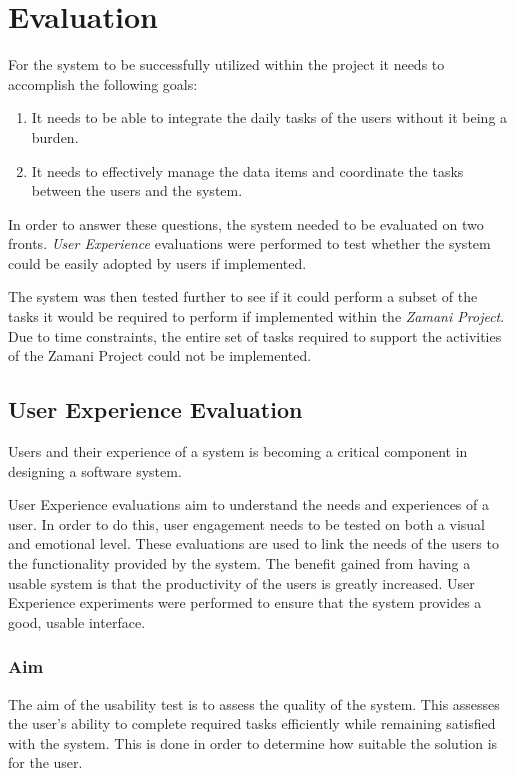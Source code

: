 \chapter{Evaluation\label{chap3}}

For the system to be successfully utilized within the project
it needs to accomplish the following goals:
\begin{enumerate}
\item It needs to be able to integrate the daily tasks of the users
      without it being a burden.
\item It needs to effectively  manage the data items and
      coordinate the tasks between the users and the system.
\end{enumerate}

In order to answer these questions, the system needed to be evaluated on two
fronts. \emph{User Experience} evaluations were performed to test whether the
system could be easily adopted by users if implemented.

The system was then tested further to see if it could perform
a subset of the tasks it would be required to perform if implemented within
the \emph{Zamani Project}. Due to time constraints, the entire set of tasks required
to support the activities of the Zamani Project could not be implemented.

\section{User Experience Evaluation}
Users and their experience of a system is becoming a critical component
in designing a software system\cite{Forlizzi:2004:UEI:1013115.1013152}.

User Experience evaluations aim to understand the needs and experiences of a user.
In order to do this, user engagement needs to be tested on both a visual and emotional level.
These evaluations are used to link the needs of the users to the functionality provided by the
system. The benefit gained from having a usable system is that the productivity
of the users is greatly increased\cite{nielsen2003usability}.
User Experience experiments were performed to ensure that the system
provides a good, usable interface.

\subsection{Aim}
The aim of the usability test is to assess the quality of the system. This
assesses the user's ability to complete required tasks efficiently while
remaining satisfied with the system\cite{bevan1995measuring}. This is done in
order to determine how suitable the solution is for the user.

